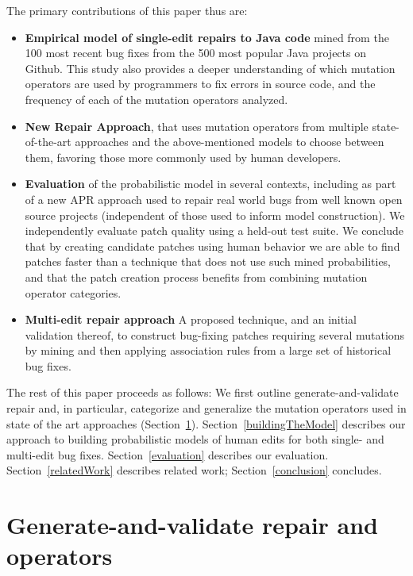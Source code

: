 \documentclass[conference]{IEEEtran}
\begin{document}
The primary contributions of this paper thus are:
\begin{itemize}
    \item \textbf{Empirical model of single-edit repairs to Java code} mined
      from the 100 most recent bug fixes from the 500 most popular Java projects on
    Github. This study also provides a deeper
    understanding of which mutation operators are used by programmers to fix
    errors in source code, and the frequency of each of the mutation operators
    analyzed. 
  \item \textbf{New Repair Approach}, that uses mutation operators
    from multiple state-of-the-art approaches and
    the above-mentioned models to choose between them, favoring those more commonly
    used by human developers.
  \item \textbf{Evaluation} of the probabilistic model in several
    contexts, including as part of a new APR approach used to repair real world bugs from well
    known open source projects (independent of those used to inform model
    construction). We independently evaluate patch quality using a held-out test
    suite. We conclude that by creating candidate patches using human behavior
    we are able to find patches faster than a technique that does not use such
    mined probabilities, and that the patch creation
    process benefits from combining mutation operator categories.  
  \item \textbf{Multi-edit repair approach} A proposed technique, and an initial
    validation thereof, to construct 
    bug-fixing patches requiring several mutations by mining and then applying association
    rules from a large set of historical bug fixes. 
\end{itemize}

The rest of this paper proceeds as follows: We first outline
generate-and-validate repair and, in particular, 
categorize and generalize the mutation operators used in state of the art
approaches (Section~\ref{background}). Section~\ref{buildingTheModel}
describes our approach to building probabilistic models of human 
edits for both single- and multi-edit bug fixes. Section~\ref{evaluation}
describes our evaluation. Section~\ref{relatedWork} describes
related work; Section~\ref{conclusion} concludes. 

\section{Generate-and-validate repair and operators} 
\label{background}
\end{document}
